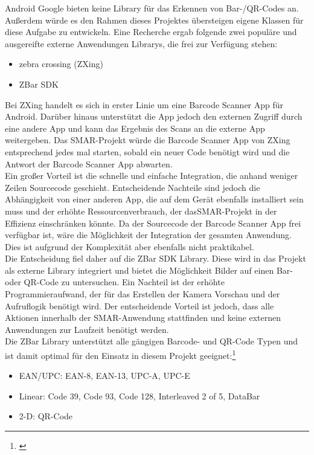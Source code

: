 Android \bzw Google bieten keine Library für das Erkennen von Bar-/QR-Codes an. Außerdem würde es den Rahmen dieses Projektes übersteigen eigene Klassen für diese Aufgabe zu entwickeln. Eine Recherche ergab folgende zwei populäre und ausgereifte externe Anwendungen \bzw Librarys, die frei zur Verfügung stehen:
\begin{itemize}
	\item zebra crossing (ZXing)
	\item ZBar SDK
\end{itemize}
Bei ZXing handelt es sich in erster Linie um eine Barcode Scanner App für Android. Darüber hinaus unterstützt die App jedoch den externen Zugriff durch eine andere App und kann das Ergebnis des Scans an die externe App weitergeben. Das \ac{SMAR}-Projekt würde die Barcode Scanner App von ZXing entsprechend jedes mal starten, sobald ein neuer Code benötigt wird und die Antwort der Barcode Scanner App abwarten.\\
Ein großer Vorteil ist die schnelle und einfache Integration, die anhand weniger Zeilen Sourcecode geschieht. Entscheidende Nachteile sind jedoch die Abhängigkeit von einer anderen App, die auf dem Gerät ebenfalls installiert sein muss und der erhöhte Ressourcenverbrauch, der das\ac{SMAR}-Projekt in der Effizienz einschränken könnte. Da der Sourcecode der Barcode Scanner App frei verfügbar ist, wäre die Möglichkeit der Integration der gesamten Anwendung. Dies ist aufgrund der Komplexität aber ebenfalls nicht praktikabel.\\

Die Entscheidung fiel daher auf die ZBar SDK Library. Diese wird in das Projekt als externe Library integriert und bietet die Möglichkeit Bilder auf einen Bar- oder QR-Code zu untersuchen. Ein Nachteil ist der erhöhte Programmieraufwand, der für das Erstellen der Kamera Vorschau und der Aufruflogik benötigt wird. Der entscheidende Vorteil ist jedoch, dass alle Aktionen innerhalb der \ac{SMAR}-Anwendung stattfinden und keine externen Anwendungen zur Laufzeit benötigt werden.\\

Die ZBar Library unterstützt alle gängigen Barcode- und QR-Code Typen und ist damit optimal für den Einsatz in diesem Projekt geeignet:\footnote{\citep{zbar}}
\begin{itemize}
	\item EAN/UPC: EAN-8, EAN-13, UPC-A, UPC-E
	\item Linear: Code 39, Code 93, Code 128, Interleaved 2 of 5, DataBar
	\item 2-D: QR-Code
\end{itemize}

